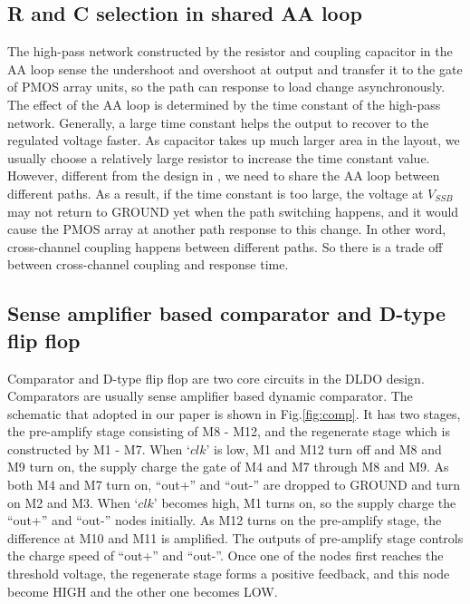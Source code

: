 \documentclass[journal]{IEEEtran}
\begin{document}
\subsection{R and C selection in shared AA loop}
The high-pass network constructed by the resistor and coupling capacitor in the AA loop sense the undershoot and overshoot at output and transfer it to the gate of PMOS array units, so the path can response to load change asynchronously. The effect of the AA loop is determined by the time constant of the high-pass network. Generally, a large time constant helps the output to recover to the regulated voltage faster. As capacitor takes up much larger area in the layout, we usually choose a relatively large resistor to increase the time constant value. However, different from the design in \cite{NANDbasedAAloop,AALDO1}, we need to share the AA loop between different paths. As a result, if the time constant is too large, the voltage at $V_{SSB}$ may not return to GROUND yet when the path switching happens, and it would cause the PMOS array at another path response to this change. In other word, cross-channel coupling happens between different paths. So there is a trade off between cross-channel coupling and response time.
\subsection{Sense amplifier based comparator and D-type flip flop}
Comparator and D-type flip flop are two core circuits in the DLDO design. Comparators are usually sense amplifier based dynamic comparator. The schematic that adopted in our paper is shown in Fig.\ref{fig:comp}\cite{comparator}. It has two stages, the pre-amplify stage consisting of M8 - M12, and the regenerate stage which is constructed by M1 - M7. When `$clk$' is low, M1 and M12 turn off and M8 and M9 turn on, the supply charge the gate of M4 and M7 through M8 and M9. As both M4 and M7 turn on, ``out+'' and ``out-'' are dropped to GROUND and turn on M2 and M3. When `$clk$' becomes high, M1 turns on, so the supply charge the ``out+'' and ``out-'' nodes initially. As M12 turns on the pre-amplify stage, the difference at M10 and M11 is amplified. The outputs of pre-amplify stage controls the charge speed of ``out+'' and ``out-''. Once one of the nodes first reaches the threshold voltage, the regenerate stage forms a positive feedback, and this node become HIGH and the other one becomes LOW.
\end{document}
